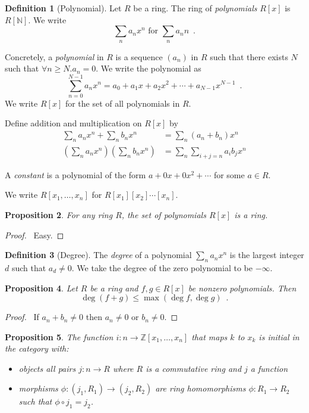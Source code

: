 \documentclass{book}
\let\qed\relax
\newtheorem{prop}{Proposition}[chapter]
\theoremstyle{definition}
\newtheorem{df}[prop]{Definition}
\begin{document}
\begin{df}[Polynomial]
Let $R$ be a ring. The ring of \emph{polynomials} $R[x]$ is $R[\mathbb{N}]$. We write 
\[ \sum_n a_n x^n \text{ for } \sum_n a_n n \enspace . \]

Concretely, a \emph{polynomial} in $R$ is a sequence $(a_n)$ in $R$ such that there exists $N$ such that $\forall n \geq N. a_n = 0$. We write the polynomial as
\[ \sum_{n=0}^{N-1} a_n x^n = a_0 + a_1 x + a_2 x^2 + \cdots + a_{N-1} x^{N-1} \enspace . \]
We write $R[x]$ for the set of all polynomials in $R$.

Define addition and multiplication on $R[x]$ by
\begin{align*}
\sum_n a_n x^n + \sum_n b_n x^n & = \sum_n (a_n + b_n) x^n \\
\left( \sum_n a_n x^n \right) \left( \sum_n b_n x^n \right) & = \sum_n \sum_{i+j=n} a_i b_j x^n
\end{align*}

A \emph{constant} is a polynomial of the form $a + 0x + 0x^2 + \cdots$ for some $a \in R$.

We write $R[x_1, \ldots, x_n]$ for $R[x_1][x_2] \cdots [x_n]$.
\end{df}

\begin{prop}
For any ring $R$, the set of polynomials $R[x]$ is a ring.
\end{prop}

\begin{proof}
\pf\ Easy. \qed
\end{proof}

\begin{df}[Degree]
The \emph{degree} of a polynomial $\sum_n a_n x^n$ is the largest integer $d$ such that $a_d \neq 0$. We take the degree of the zero polynomial to be $- \infty$.
\end{df}

\begin{prop}
Let $R$ be a ring and $f,g \in R[x]$ be nonzero polynomials. Then
\[ \deg(f + g) \leq \max(\deg f, \deg g) \enspace . \]
\end{prop}

\begin{proof}
\pf\ If $a_n + b_n \neq 0$ then $a_n \neq 0$ or $b_n \neq 0$. \qed
\end{proof}

\begin{prop}
The function $i : n \rightarrow \mathbb{Z}[x_1, \ldots, x_n]$ that maps $k$ to $x_k$ is initial in the category with:
\begin{itemize}
\item objects all pairs $j : n \rightarrow R$ where $R$ is a commutative ring and $j$ a function
\item morphisms $\phi : (j_1, R_1) \rightarrow (j_2,R_2)$ are ring homomorphisms $\phi : R_1 \rightarrow R_2$ such that $\phi \circ j_1 = j_2$.
\end{itemize}
\end{prop}
\end{document}
